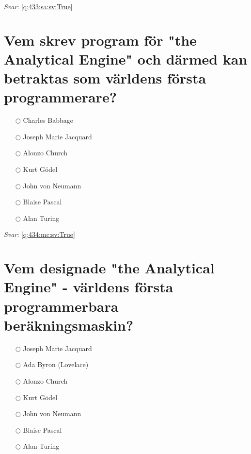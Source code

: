 \documentclass[a4paper,11pt,oneside]{book}
\begin{document}
\begin{sloppypar}
\vspace{1cm}

\textit{Svar}: \autoref{q:433:sa:sv:True}



\section{Vem skrev program f\"or "the Analytical Engine" och d\"armed kan betraktas som v\"arldens f\"orsta programmerare?}

\label{q:434:mc:sv:False}

\begin{itemize}
  \item[$\bigcirc$] Charles Babbage
  \item[$\bigcirc$] Joseph Marie Jacquard
  \item[$\bigcirc$] Alonzo Church
  \item[$\bigcirc$] Kurt G\"odel
  \item[$\bigcirc$] John von Neumann
  \item[$\bigcirc$] Blaise Pascal
  \item[$\bigcirc$] Alan Turing
\end{itemize}

\vspace{1cm}

\textit{Svar}: \autoref{q:434:mc:sv:True}



\section{Vem designade "the Analytical Engine" - v\"arldens f\"orsta programmerbara ber\"akningsmaskin?}

\label{q:435:mc:sv:False}

\begin{itemize}
  \item[$\bigcirc$] Joseph Marie Jacquard
  \item[$\bigcirc$] Ada Byron (Lovelace)
  \item[$\bigcirc$] Alonzo Church
  \item[$\bigcirc$] Kurt G\"odel
  \item[$\bigcirc$] John von Neumann
  \item[$\bigcirc$] Blaise Pascal
  \item[$\bigcirc$] Alan Turing
\end{itemize}

\vspace{1cm}


\end{sloppypar}
\end{document}
